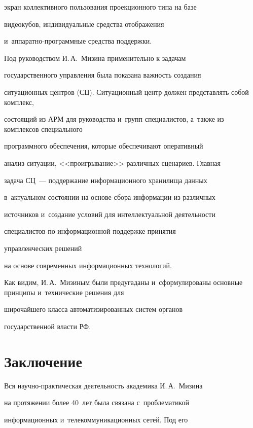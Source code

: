 экран коллективного пользования проекционного типа на базе


видеокубов, индивидуальные средства отображения


     и~ап\-па\-рат\-но-про\-грам\-мные средства поддержки.





     Под руководством И.\,А.~Мизина применительно к задачам


государственного управления была показана важность создания


ситуационных центров (СЦ). Ситуационный центр должен представлять собой комплекс,


состоящий из АРМ для руководства и~групп специалистов, а~также из комплексов специального


программного обеспечения, которые обеспечивают оперативный


анализ ситуации, <<проигрывание>> различных сценариев. Главная


задача СЦ~--- поддержание информационного хранилища данных


в~актуальном состоянии на основе сбора информации из различных


источников и~создание условий для интеллектуальной деятельности


специалистов по информационной поддержке принятия


управленческих решений


на основе современных информационных технологий.





     Как видим, И.\,А.~Мизиным были предугаданы и~сформулированы основные принципы и~технические решения для


широчайшего класса автоматизированных систем органов


государственной власти РФ.





\section{Заключение}





     Вся научно-практическая деятельность академика И.\,А.~Мизина


на протяжении более 40~лет была связана с~проблематикой


информационных и~телекоммуникационных сетей. Под его


